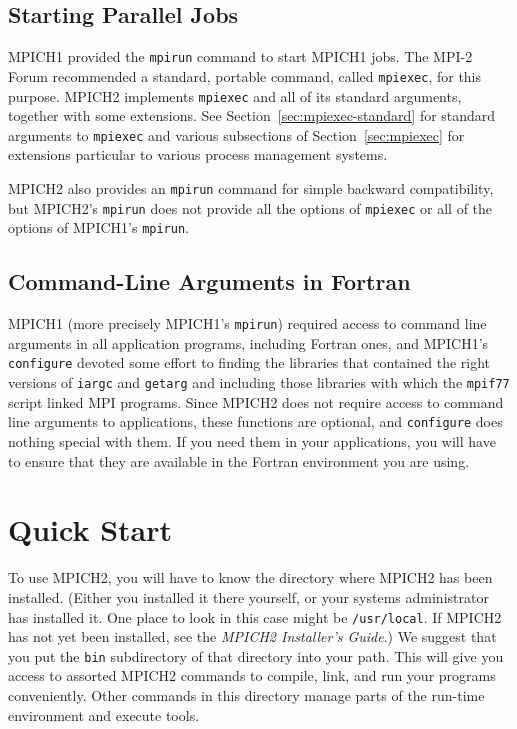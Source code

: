 \documentclass[dvipdfm,11pt]{article}
\begin{document}
\subsection{Starting Parallel Jobs}
\label{sec:startup}

MPICH1 provided the \texttt{mpirun} command to start MPICH1 jobs.  The
MPI-2 Forum recommended a standard, portable command, called
\texttt{mpiexec}, for this purpose.  MPICH2 implements \texttt{mpiexec}
and all of its standard arguments, together with some extensions.  See
Section~\ref{sec:mpiexec-standard} for standard arguments to
\texttt{mpiexec} and various subsections of Section~\ref{sec:mpiexec}
for extensions particular to various process management systems.

MPICH2 also provides an \texttt{mpirun} command for simple backward
compatibility, but MPICH2's \texttt{mpirun} does not provide all the
options of \texttt{mpiexec} or all of the options of MPICH1's
\texttt{mpirun}. 


\subsection{Command-Line Arguments in Fortran}
\label{sec:fortran-command-line}

MPICH1 (more precisely MPICH1's \texttt{mpirun}) required access to
command line arguments in all application programs, including Fortran
ones, and MPICH1's \texttt{configure} devoted some effort to finding the
libraries that contained the right versions of \texttt{iargc} and
\texttt{getarg} and including those libraries with which the
\texttt{mpif77} script linked MPI programs.
Since MPICH2 does not require access to command line
arguments to applications, these functions are optional, and
\texttt{configure} does nothing special with them.  If you need them in
your applications, you will have to ensure that they are available in
the Fortran environment you are using.

\section{Quick Start}
\label{sec:quickstart}

To use MPICH2, you will have to know the directory where MPICH2 has been
installed. 
(Either you installed it there yourself, or your systems administrator has
installed it.  One place to look in this case might be \texttt{/usr/local}.
If MPICH2 has not yet been installed, see the \emph{MPICH2 Installer's Guide}.)
We suggest that you put the \texttt{bin} subdirectory of that directory into
your path.  This will give you access to assorted MPICH2 commands to
compile, link, and run your programs conveniently.  Other commands in
this directory manage parts of the run-time environment and execute
tools.  
\end{document}
